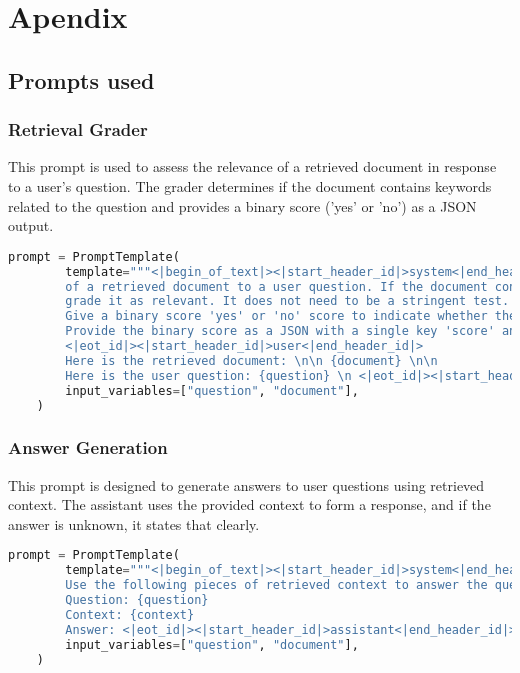 \chapter*{Apendix}

\section{Prompts used}

\subsection{Retrieval Grader}

This prompt is used to assess the relevance of a retrieved document in response to a user's question. The grader determines if the document contains keywords related to the question and provides a binary score ('yes' or 'no') as a JSON output.

\begin{lstlisting}[language=Python, caption=\it{Prompt used for the retrieval grader.}]
    prompt = PromptTemplate(
        template="""<|begin_of_text|><|start_header_id|>system<|end_header_id|> You are a grader assessing relevance 
        of a retrieved document to a user question. If the document contains keywords related to the user question, 
        grade it as relevant. It does not need to be a stringent test. The goal is to filter out erroneous retrievals. \n
        Give a binary score 'yes' or 'no' score to indicate whether the document is relevant to the question. \n
        Provide the binary score as a JSON with a single key 'score' and no premable or explanation.
        <|eot_id|><|start_header_id|>user<|end_header_id|>
        Here is the retrieved document: \n\n {document} \n\n
        Here is the user question: {question} \n <|eot_id|><|start_header_id|>assistant<|end_header_id|>""",
        input_variables=["question", "document"],
    )
\end{lstlisting}

\subsection{Answer Generation}

This prompt is designed to generate answers to user questions using retrieved context. The assistant uses the provided context to form a response, and if the answer is unknown, it states that clearly.


\begin{lstlisting}[language=Python, caption=\it{Prompt used for answer generation.}]
    prompt = PromptTemplate(
        template="""<|begin_of_text|><|start_header_id|>system<|end_header_id|> You are an assistant for question-answering tasks. 
        Use the following pieces of retrieved context to answer the question. If you don't know the answer, just say that you don't know. <|eot_id|><|start_header_id|>user<|end_header_id|>
        Question: {question} 
        Context: {context} 
        Answer: <|eot_id|><|start_header_id|>assistant<|end_header_id|>""",
        input_variables=["question", "document"],
    )
\end{lstlisting}

